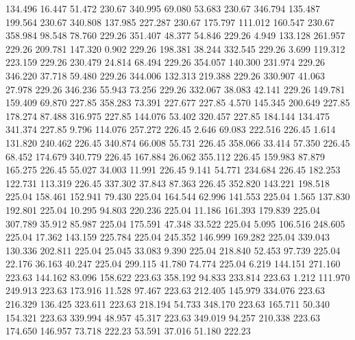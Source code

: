  134.496   16.447   51.472       230.67
 340.995   69.080   53.683       230.67
 346.794  135.487  199.564       230.67
 340.808  137.985  227.287       230.67
 175.797  111.012  160.547       230.67
 358.984   98.548   78.760       229.26
 351.407   48.377   54.846       229.26
   4.949  133.128  261.957       229.26
 209.781  147.320    0.902       229.26
 198.381   38.244  332.545       229.26
   3.699  119.312  223.159       229.26
 230.479   24.814   68.494       229.26
 354.057  140.300  231.974       229.26
 346.220   37.718   59.480       229.26
 344.006  132.313  219.388       229.26
 330.907   41.063   27.978       229.26
 346.236   55.943   73.256       229.26
 332.067   38.083   42.141       229.26
 149.781  159.409   69.870       227.85
 358.283   73.391  227.677       227.85
   4.570  145.345  200.649       227.85
 178.274   87.488  316.975       227.85
 144.076   53.402  320.457       227.85
 184.144  134.475  341.374       227.85
   9.796  114.076  257.272       226.45
   2.646   69.083  222.516       226.45
   1.614  131.820  240.462       226.45
 340.874   66.008   55.731       226.45
 358.066   33.414   57.350       226.45
  68.452  174.679  340.779       226.45
 167.884   26.062  355.112       226.45
 159.983   87.879  165.275       226.45
  55.027   34.003   11.991       226.45
   9.141   54.771  234.684       226.45
 182.253  122.731  113.319       226.45
 337.302   37.843   87.363       226.45
 352.820  143.221  198.518       225.04
 158.461  152.941   79.430       225.04
 164.544   62.996  141.553       225.04
   1.565  137.830  192.801       225.04
  10.295   94.803  220.236       225.04
  11.186  161.393  179.839       225.04
 307.789   35.912   85.987       225.04
 175.591   47.348   33.522       225.04
   5.095  106.516  248.605       225.04
  17.362  143.159  225.784       225.04
 245.352  146.999  169.282       225.04
 339.043  130.336  202.811       225.04
  25.045   33.083    9.390       225.04
 218.840   52.453   97.739       225.04
  22.176   36.163   40.247       225.04
 299.115   41.780   74.774       225.04
   6.219  144.151  271.160       223.63
 144.162   83.096  158.622       223.63
 358.192   94.833  233.814       223.63
   1.212  111.970  249.913       223.63
 173.916   11.528   97.467       223.63
 212.405  145.979  334.076       223.63
 216.329  136.425  323.611       223.63
 218.194   54.733  348.170       223.63
 165.711   50.340  154.321       223.63
 339.994   48.957   45.317       223.63
 349.019   94.257  210.338       223.63
 174.650  146.957   73.718       222.23
  53.591   37.016   51.180       222.23

